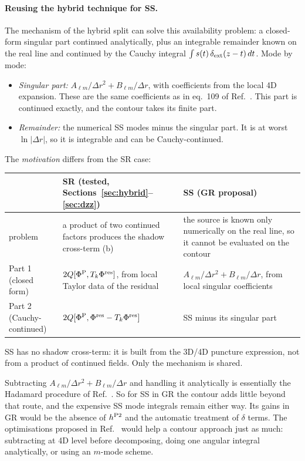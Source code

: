 \documentclass[11pt,a4paper]{article}
\newcommand{\dext}{\delta_{\rm ext}}
\begin{document}
\paragraph{Reusing the hybrid technique for SS.}
The mechanism of the hybrid split can solve this availability problem: a closed-form singular part continued analytically, plus an integrable remainder known on the real line and continued by the Cauchy integral $\int s(t)\,\dext(z-t)\,dt$.
Mode by mode:
\begin{itemize}[nosep]
\item \emph{Singular part:} $A_{\ell m}/\Delta r^2+B_{\ell m}/\Delta r$, with coefficients from the local 4D expansion. These are the same coefficients as in eq.~109 of Ref.~\cite{MusaeusPoundUpton2026}. This part is continued exactly, and the contour takes its finite part.
\item \emph{Remainder:} the numerical SS modes minus the singular part. It is at worst $\ln|\Delta r|$, so it is integrable and can be Cauchy-continued.
\end{itemize}
The \emph{motivation} differs from the SR case:
\begin{center}
\small
\renewcommand{\arraystretch}{1.2}
\begin{tabular}{@{}>{\raggedright}p{2.4cm}>{\raggedright}p{6.0cm}>{\raggedright\arraybackslash}p{6.0cm}@{}}
\toprule
& SR (tested, Sections~\ref{sec:hybrid}--\ref{sec:dzz}) & SS (GR proposal)\\
\midrule
problem & a product of two continued factors produces the shadow cross-term (b) & the source is known only numerically on the real line, so it cannot be evaluated on the contour\\
Part 1 (closed form) & $2Q[\Phi^{\rm P},T_k\Phi^{\rm res}]$, from local Taylor data of the residual & $A_{\ell m}/\Delta r^2+B_{\ell m}/\Delta r$, from local singular coefficients\\
Part 2 (Cauchy-continued) & $2Q[\Phi^{\rm P},\Phi^{\rm res}-T_k\Phi^{\rm res}]$ & SS minus its singular part\\
\bottomrule
\end{tabular}
\end{center}
SS has no shadow cross-term: it is built from the 3D/4D puncture expression, not from a product of continued fields.
Only the mechanism is shared.

Subtracting $A_{\ell m}/\Delta r^2+B_{\ell m}/\Delta r$ and handling it analytically is essentially the Hadamard procedure of Ref.~\cite{MusaeusPoundUpton2026}.
So for SS in GR the contour adds little beyond that route, and the expensive SS mode integrals remain either way.
Its gains in GR would be the absence of $h^{\rm P2}$ and the automatic treatment of $\delta$ terms.
The optimisations proposed in Ref.~\cite{Upton2026} would help a contour approach just as much: subtracting at 4D level before decomposing, doing one angular integral analytically, or using an $m$-mode scheme.
\end{document}
